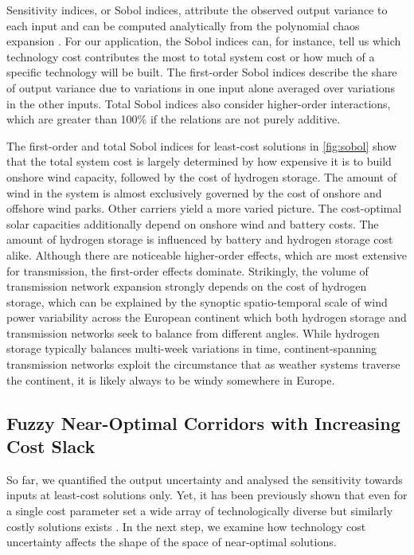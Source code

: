 Sensitivity indices, or Sobol indices, attribute the observed output variance to each input and
can be computed analytically from the polynomial chaos expansion \cite{sudret_global_2008}.
For our application, the Sobol indices can, for instance, tell us which technology cost
contributes the most to total system cost or how much of a specific technology will be built.
The first-order Sobol indices describe the share of output variance
due to variations in one input alone averaged over variations in the other inputs.
Total Sobol indices also consider higher-order interactions,
which are greater than 100\% if the relations are not purely additive.

The first-order and total Sobol indices for least-cost solutions in
\cref{fig:sobol} show that the total system cost is largely determined by how
expensive it is to build onshore wind capacity, followed by the cost of hydrogen
storage. The amount of wind in the system is almost exclusively governed by the
cost of onshore and offshore wind parks. Other carriers yield a more varied
picture. The cost-optimal solar capacities additionally depend on onshore wind
and battery costs. The amount of hydrogen storage is influenced by battery and
hydrogen storage cost alike.  Although there are noticeable higher-order
effects, which are most extensive for transmission, the first-order effects
dominate. Strikingly, the volume of transmission network expansion strongly
depends on the cost of hydrogen storage, which can be explained by the synoptic
spatio-temporal scale of wind power variability across the European continent
which both hydrogen storage and transmission networks seek to balance from
different angles. While hydrogen storage typically balances multi-week
variations in time, continent-spanning transmission networks exploit the
circumstance that as weather systems traverse the continent, it is likely always
to be windy somewhere in Europe.

\subsection{Fuzzy Near-Optimal Corridors with Increasing Cost Slack}

So far, we quantified the output uncertainty and analysed the sensitivity
towards inputs at least-cost solutions only. Yet, it has been previously shown
that even for a single cost parameter set a wide array of technologically
diverse but similarly costly solutions exists \cite{nearoptimal}. In the next
step, we examine how technology cost uncertainty affects the shape of the space
of near-optimal solutions.

